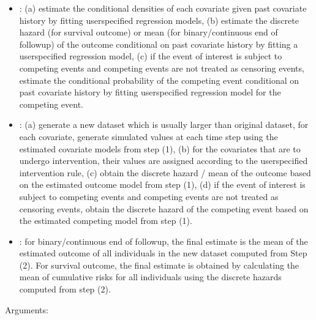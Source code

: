 \documentclass[letterpaper,10pt,english]{sphinxmanual}
\begin{document}
\begin{itemize}
\item {} 
\sphinxAtStartPar
{}: (a) estimate the conditional densities of each covariate given past covariate history
by fitting user\sphinxhyphen{}specified regression models, (b) estimate the discrete hazard (for survival outcome) or mean
(for binary/continuous end of follow\sphinxhyphen{}up) of the outcome conditional on past covariate history by fitting a user\sphinxhyphen{}specified
regression model, (c) if the event of interest is subject to competing events and competing events are not treated as censoring events, estimate the conditional probability of the competing event
conditional on past covariate history by fitting user\sphinxhyphen{}specified regression model for the competing event.

\item {} 
\sphinxAtStartPar
{}: (a) generate a new dataset which is usually larger than original dataset, for each covariate,
generate simulated values at each time step using the estimated covariate models from step (1), (b) for the
covariates that are to undergo intervention, their values are assigned according to the user\sphinxhyphen{}specified intervention rule,
(c) obtain the discrete hazard / mean of the outcome based on the estimated outcome model from step (1),
(d) if the event of interest is subject to competing events and competing events are not treated as censoring events,
obtain the discrete hazard of the competing event based on the estimated competing model from step (1).

\item {} 
\sphinxAtStartPar
{}: for binary/continuous end of follow\sphinxhyphen{}up, the final estimate is the mean of
the estimated outcome of all individuals in the new dataset computed from Step (2). For survival outcome,
the final estimate is obtained by calculating the mean of cumulative risks for all individuals using the discrete hazards computed from step (2).

\end{itemize}

\sphinxAtStartPar
Arguments:

\label{\detokenize{Get Started:module-pygformula.parametric_gformula}}
\end{document}
